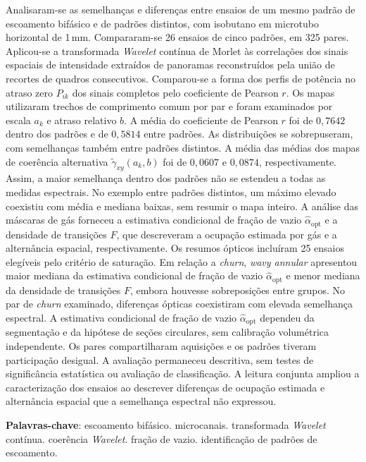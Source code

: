 \setlength{\absparsep}{18pt} %
\begin{resumo}
Analisaram-se as semelhanças e diferenças entre ensaios de um mesmo padrão de
escoamento bifásico e de padrões distintos, com isobutano em microtubo horizontal
de 1\,mm. Compararam-se 26 ensaios de cinco padrões, em 325 pares.
Aplicou-se a transformada \textit{Wavelet} contínua de Morlet às correlações dos
sinais espaciais de intensidade extraídos de panoramas reconstruídos pela união
de recortes de quadros consecutivos. Comparou-se a forma dos perfis de potência
no atraso zero $P_{ik}$ dos sinais completos pelo coeficiente de Pearson $r$.
Os mapas utilizaram trechos de comprimento comum por par e foram examinados por
escala $a_k$ e atraso relativo $b$. A média do coeficiente de Pearson $r$ foi de
$0{,}7642$ dentro dos padrões e de $0{,}5814$ entre padrões. As distribuições
se sobrepuseram, com semelhanças também entre padrões distintos.
A média das médias dos mapas de coerência alternativa
$\widetilde\gamma_{xy}(a_k,b)$ foi de $0{,}0607$ e $0{,}0874$, respectivamente.
Assim, a maior semelhança dentro dos padrões não se estendeu a todas as medidas
espectrais. No exemplo entre padrões distintos, um máximo elevado coexistiu
com média e mediana baixas, sem resumir o mapa inteiro.
A análise das máscaras de gás forneceu a estimativa condicional de fração de
vazio $\widehat\alpha_{\mathrm{opt}}$ e a densidade de transições $F$, que
descreveram a ocupação estimada por gás e a alternância espacial, respectivamente.
Os resumos ópticos incluíram 25 ensaios elegíveis pelo critério de saturação.
Em relação a \textit{churn}, \textit{wavy annular} apresentou maior mediana da
estimativa condicional de fração de vazio $\widehat\alpha_{\mathrm{opt}}$ e
menor mediana da densidade de transições $F$, embora houvesse sobreposições
entre grupos. No par de \textit{churn} examinado, diferenças ópticas coexistiram
com elevada semelhança espectral. A estimativa condicional de fração de vazio
$\widehat\alpha_{\mathrm{opt}}$ dependeu da segmentação e da hipótese de seções
circulares, sem calibração volumétrica independente. Os pares compartilharam
aquisições e os padrões tiveram participação desigual. A avaliação permaneceu
descritiva, sem testes de significância estatística ou avaliação de classificação.
A leitura conjunta ampliou a caracterização dos ensaios ao descrever diferenças
de ocupação estimada e alternância espacial que a semelhança espectral não expressou.

 \textbf{Palavras-chave}: escoamento bifásico. microcanais. transformada \textit{Wavelet} contínua. coerência \textit{Wavelet}. fração de vazio. identificação de padrões de escoamento.
\end{resumo}

